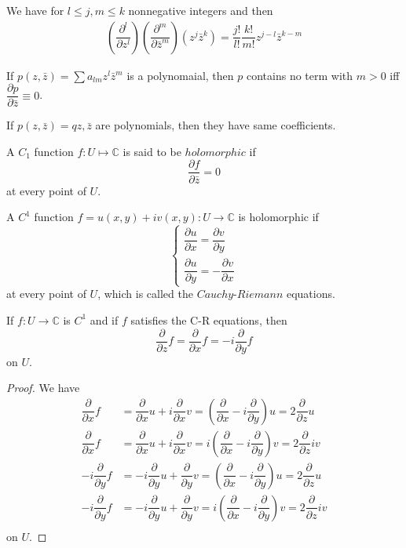 \documentclass[lang=en, color=blue, ]{elegantbook}
\newcommand{\C}{\mathbb{C}}
\newcommand{\ParZ}{\dfrac{\partial}{\partial z}}
\newcommand{\ParX}{\dfrac{\partial}{\partial x}}
\newcommand{\ParY}{\dfrac{\partial}{\partial y}}
\begin{document}
\begin{proposition}
    We have for $l\leq j, m\leq k$ nonnegative integers and then
    \[
    \begin{aligned}
    (\dfrac{\partial^l}{\partial z^l})(\dfrac{\partial^m}{\partial \bar{z}^m})(z^j\bar{z}^k) = \dfrac{j!}{l!}\dfrac{k!}{m!}z^{j-l}\bar{z}^{k-m}
    \end{aligned}
    \]
\end{proposition}

\begin{proposition}
    If $p(z,\bar{z}) = \sum a_{lm} z^l\bar{z}^m$ is a polynomaial, then $p$ contains no term with $m>0$ iff $\dfrac{\partial p}{\partial \bar{z}} \equiv 0$. 
\end{proposition}

\begin{corollary}
    If $p(z,\bar{z}) = q{z,\bar{z}}$ are polynomials, then they have same coefficients.
\end{corollary}

\begin{definition}
    A $C_1$ function $f:U\mapsto \C$ is said to be $holomorphic$ if
    \[\dfrac{\partial f}{\partial \bar{z}} = 0\]
    at every point of $U$.
\end{definition}

\begin{definition}
    A $C^1$ function $f = u(x,y)+iv(x,y): U \to \C$ is holomorphic if
    \[
    \begin{cases}\dfrac{\partial u}{\partial x} = \dfrac{\partial v}{\partial y} \\
    \dfrac{\partial u}{\partial y} = -\dfrac{\partial v}{\partial x}
    \end{cases}\]
    at every point of $U$, which is called the $Cauchy$-$Riemann$ equations.
\end{definition}

\begin{proposition}
    If $f:U\to\C$ is $C^1$ and if $f$ satisfies the C-R equations, then
    \[\ParZ f = \ParX f = -i\ParY f \]
    on $U$.
\end{proposition}
\begin{proof}\par
    We have
    \[
    \begin{aligned}
    \ParX f &= \ParX u + i\ParX v = (\ParX -i\ParY) u = 2\ParZ u \\
    \ParX f &= \ParX u + i\ParX v = i(\ParX - i\ParY) v = 2\ParZ iv \\
    -i\ParY f &= -i\ParY u + \ParY v = (\ParX -i\ParY) u = 2\ParZ u \\
    -i\ParY f &= -i\ParY u + \ParY v = i(\ParX - i\ParY) v = 2\ParZ iv \\
    \end{aligned}
    \]
    on $U$.
\end{proof}
\end{document}
